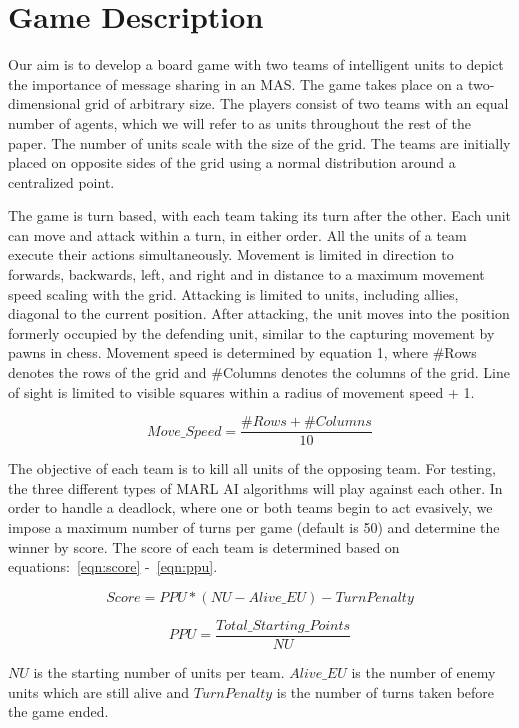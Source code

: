 \section{Game Description} \label{Game Description}

Our aim is to develop a board game with two teams of intelligent units to depict the importance of message sharing in an MAS. The game takes place on a two-dimensional grid of arbitrary size. The players consist of two teams with an equal number of agents, which we will refer to as units throughout the rest of the paper. The number of units scale with the size of the grid. The teams are initially placed on opposite sides of the grid using a normal distribution around a centralized point.

The game is turn based, with each team taking its turn after the other. Each unit can move and attack within a turn, in either order. All the units of a team execute their actions simultaneously. Movement is limited in direction to forwards, backwards, left, and right and in distance to a maximum movement speed scaling with the grid. Attacking is limited to units, including allies, diagonal to the current position. After attacking, the unit moves into the position formerly occupied by the defending unit, similar to the capturing movement by pawns in chess. Movement speed is determined by equation 1, where \#Rows denotes the rows of the grid and \#Columns denotes the columns of the grid. Line of sight is limited to visible squares within a radius of movement speed + 1.

\vspace{-.3 cm}

\begin{equation}\label{eqn:moveSpeed}
Move\_Speed = \frac{\#Rows + \#Columns}{10}
\end{equation}

The objective of each team is to kill all units of the opposing team. For testing, the three different types of MARL AI algorithms will play against each other. In order to handle a deadlock, where one or both teams begin to act evasively, we impose a maximum number of turns per game (default is 50) and determine the winner by score. The score of each team is determined based on equations:~\ref{eqn:score} -~\ref{eqn:ppu}.

\vspace{-.5 cm}

\begin{equation}\label{eqn:score}
Score = PPU * (NU - Alive\_{EU}) - TurnPenalty 
\end{equation}

\vspace{-.4 cm}

\begin{equation}\label{eqn:ppu}
PPU = \dfrac{Total\_Starting\_Points}{NU}
\end{equation}

\vspace{-.05 cm}

$NU$ is the starting number of units per team. $Alive\_{EU}$ is the number of enemy units which are still alive and $TurnPenalty$ is the number of turns taken before the game ended.
 

